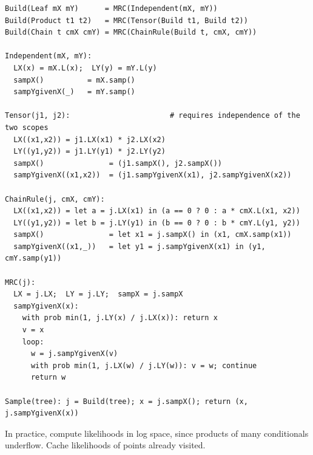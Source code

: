 \documentclass[11pt]{article}
\theoremstyle{definition}
\begin{document}
\begin{small}
\begin{verbatim}
Build(Leaf mX mY)      = MRC(Independent(mX, mY))
Build(Product t1 t2)   = MRC(Tensor(Build t1, Build t2))
Build(Chain t cmX cmY) = MRC(ChainRule(Build t, cmX, cmY))

Independent(mX, mY):
  LX(x) = mX.L(x);  LY(y) = mY.L(y)
  sampX()          = mX.samp()
  sampYgivenX(_)   = mY.samp()

Tensor(j1, j2):                       # requires independence of the two scopes
  LX((x1,x2)) = j1.LX(x1) * j2.LX(x2)
  LY((y1,y2)) = j1.LY(y1) * j2.LY(y2)
  sampX()               = (j1.sampX(), j2.sampX())
  sampYgivenX((x1,x2))  = (j1.sampYgivenX(x1), j2.sampYgivenX(x2))

ChainRule(j, cmX, cmY):
  LX((x1,x2)) = let a = j.LX(x1) in (a == 0 ? 0 : a * cmX.L(x1, x2))
  LY((y1,y2)) = let b = j.LY(y1) in (b == 0 ? 0 : b * cmY.L(y1, y2))
  sampX()               = let x1 = j.sampX() in (x1, cmX.samp(x1))
  sampYgivenX((x1,_))   = let y1 = j.sampYgivenX(x1) in (y1, cmY.samp(y1))

MRC(j):
  LX = j.LX;  LY = j.LY;  sampX = j.sampX
  sampYgivenX(x):
    with prob min(1, j.LY(x) / j.LX(x)): return x
    v = x
    loop:
      w = j.sampYgivenX(v)
      with prob min(1, j.LX(w) / j.LY(w)): v = w; continue
      return w

Sample(tree): j = Build(tree); x = j.sampX(); return (x, j.sampYgivenX(x))
\end{verbatim}
\end{small}

In practice, compute likelihoods in log space, since products of many
conditionals underflow. Cache likelihoods of points already visited.
\end{document}
